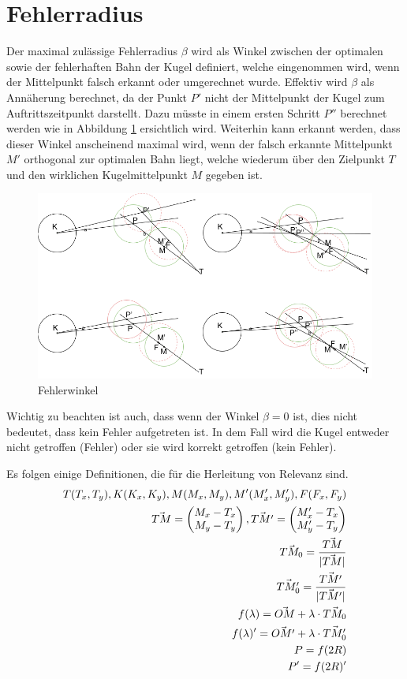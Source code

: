 \section{Fehlerradius}\label{anhang:fehler}
Der maximal zulässige Fehlerradius $\beta$ wird als Winkel zwischen der optimalen sowie der fehlerhaften Bahn
der Kugel definiert, welche eingenommen wird, wenn der Mittelpunkt falsch erkannt oder umgerechnet wurde. Effektiv
wird $\beta$ als Annäherung berechnet, da der Punkt $P'$ nicht der Mittelpunkt der Kugel zum Auftrittszeitpunkt
darstellt. Dazu müsste in einem ersten Schritt $P''$ berechnet werden wie in Abbildung \ref{fig:fehlerwinkel} ersichtlich
wird. Weiterhin kann erkannt werden, dass dieser Winkel anscheinend maximal wird, wenn der falsch erkannte Mittelpunkt
$M'$ orthogonal zur optimalen Bahn liegt, welche wiederum über den Zielpunkt $T$ und den wirklichen Kugelmittelpunkt $M$ gegeben ist.

\begin{figure}[h!]
    \begin{center}
        \includegraphics[width=0.5\linewidth]{../common/07_appendix/resources/02_fehlerwinkel.png}
    \end{center}
    \caption{Fehlerwinkel}
    \label{fig:fehlerwinkel}
\end{figure}
Wichtig zu beachten ist auch, dass wenn der Winkel $\beta = 0$ ist, dies nicht bedeutet,
dass kein Fehler aufgetreten ist. In dem Fall wird die Kugel entweder nicht getroffen (Fehler) oder sie wird korrekt
getroffen (kein Fehler).

Es folgen einige Definitionen, die für die Herleitung von Relevanz sind.
\begin{align}
    T(T_x, T_y), K(K_x, K_y), M(M_x, M_y), M'(M_x', M_y'), F(F_x, F_y)\\
    \vec{TM} = \begin{pmatrix}M_x - T_x\\M_y - T_y\end{pmatrix}, \vec{TM'} = \begin{pmatrix}M_x' - T_x\\M_y' - T_y\end{pmatrix}\\
    \vec{TM_0} = \frac{\vec{TM}}{\lvert \vec{TM} \rvert}\\
    \vec{TM_0'} = \frac{\vec{TM'}}{\lvert \vec{TM'} \rvert}\\
    f(\lambda) = \vec{OM} + \lambda \cdot \vec{TM_0}\\
    f(\lambda)' = \vec{OM'} + \lambda \cdot \vec{TM_0'}\\
    P = f(2R)\\
    P' = f(2R)'
\end{align}

